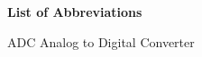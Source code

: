 
\centerline{\LARGE\bf List of Abbreviations}

\noindent
ADC \dotfill Analog to Digital Converter \\

